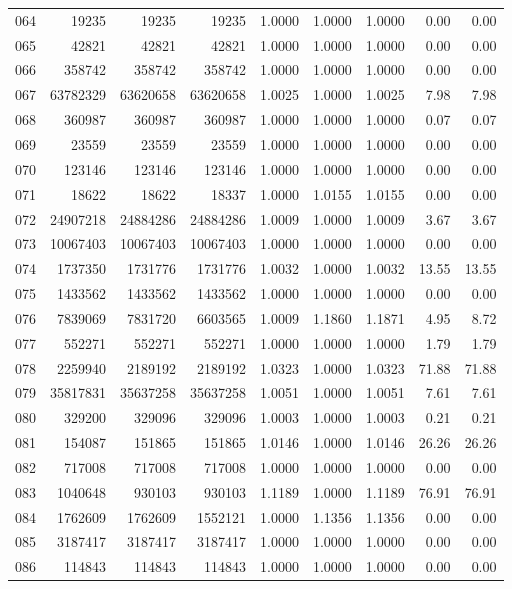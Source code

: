 \begin{longtable}{crrrrrrrr}
064 & 19235 & 19235 & 19235 & 1.0000 & 1.0000 & 1.0000 & 0.00 & 0.00 \\
065 & 42821 & 42821 & 42821 & 1.0000 & 1.0000 & 1.0000 & 0.00 & 0.00 \\
066 & 358742 & 358742 & 358742 & 1.0000 & 1.0000 & 1.0000 & 0.00 & 0.00 \\
067 & 63782329 & 63620658 & 63620658 & 1.0025 & 1.0000 & 1.0025 & 7.98 & 7.98 \\
068 & 360987 & 360987 & 360987 & 1.0000 & 1.0000 & 1.0000 & 0.07 & 0.07 \\
069 & 23559 & 23559 & 23559 & 1.0000 & 1.0000 & 1.0000 & 0.00 & 0.00 \\
070 & 123146 & 123146 & 123146 & 1.0000 & 1.0000 & 1.0000 & 0.00 & 0.00 \\
071 & 18622 & 18622 & 18337 & 1.0000 & 1.0155 & 1.0155 & 0.00 & 0.00 \\
072 & 24907218 & 24884286 & 24884286 & 1.0009 & 1.0000 & 1.0009 & 3.67 & 3.67 \\
073 & 10067403 & 10067403 & 10067403 & 1.0000 & 1.0000 & 1.0000 & 0.00 & 0.00 \\
074 & 1737350 & 1731776 & 1731776 & 1.0032 & 1.0000 & 1.0032 & 13.55 & 13.55 \\
075 & 1433562 & 1433562 & 1433562 & 1.0000 & 1.0000 & 1.0000 & 0.00 & 0.00 \\
076 & 7839069 & 7831720 & 6603565 & 1.0009 & 1.1860 & 1.1871 & 4.95 & 8.72 \\
077 & 552271 & 552271 & 552271 & 1.0000 & 1.0000 & 1.0000 & 1.79 & 1.79 \\
078 & 2259940 & 2189192 & 2189192 & 1.0323 & 1.0000 & 1.0323 & 71.88 & 71.88 \\
079 & 35817831 & 35637258 & 35637258 & 1.0051 & 1.0000 & 1.0051 & 7.61 & 7.61 \\
080 & 329200 & 329096 & 329096 & 1.0003 & 1.0000 & 1.0003 & 0.21 & 0.21 \\
081 & 154087 & 151865 & 151865 & 1.0146 & 1.0000 & 1.0146 & 26.26 & 26.26 \\
082 & 717008 & 717008 & 717008 & 1.0000 & 1.0000 & 1.0000 & 0.00 & 0.00 \\
083 & 1040648 & 930103 & 930103 & 1.1189 & 1.0000 & 1.1189 & 76.91 & 76.91 \\
084 & 1762609 & 1762609 & 1552121 & 1.0000 & 1.1356 & 1.1356 & 0.00 & 0.00 \\
085 & 3187417 & 3187417 & 3187417 & 1.0000 & 1.0000 & 1.0000 & 0.00 & 0.00 \\
086 & 114843 & 114843 & 114843 & 1.0000 & 1.0000 & 1.0000 & 0.00 & 0.00 \\

\end{longtable}
